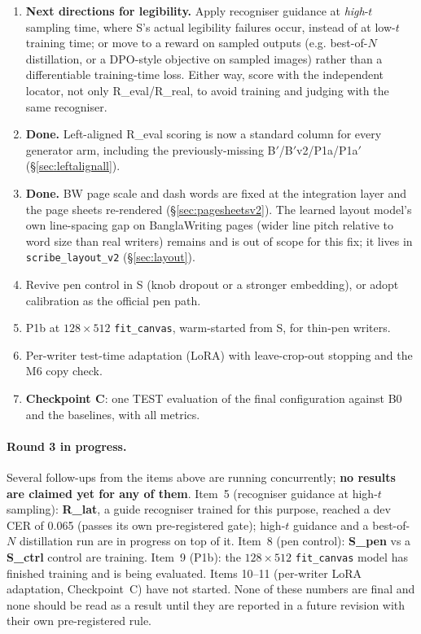 \documentclass[10.5pt,a4paper]{article}
\newcommand{\fp}[1]{\nolinkurl{#1}}
\newcommand{\Bp}{B$'$}
\begin{document}
\begin{enumerate}
  for recogniser pretraining when a generator is already available.
\item \textbf{Next directions for legibility.} Apply recogniser guidance at \emph{high}-$t$ sampling time, where S's actual
  legibility failures occur, instead of at low-$t$ training time; or move to a reward on sampled outputs (e.g. best-of-$N$
  distillation, or a DPO-style objective on sampled images) rather than a differentiable training-time loss. Either way,
  score with the independent locator, not only R\_eval/R\_real, to avoid training and judging with the same recogniser.
\item \textbf{Done.} Left-aligned R\_eval scoring is now a standard column for every generator arm, including the
  previously-missing \Bp/\Bp{}v2/P1a/P1a$'$ (\S\ref{sec:leftalignall}).
\item \textbf{Done.} BW page scale and dash words are fixed at the integration layer and the page sheets re-rendered
  (\S\ref{sec:pagesheetsv2}). The learned layout model's own line-spacing gap on BanglaWriting pages (wider line pitch
  relative to word size than real writers) remains and is out of scope for this fix; it lives in \fp{scribe_layout_v2}
  (\S\ref{sec:layout}).
\item Revive pen control in S (knob dropout or a stronger embedding), or adopt calibration as the official pen path.
\item P1b at $128\times512$ \texttt{fit\_canvas}, warm-started from S, for thin-pen writers.
\item Per-writer test-time adaptation (LoRA) with leave-crop-out stopping and the M6 copy check.
\item \textbf{Checkpoint C}: one TEST evaluation of the final configuration against B0 and the baselines, with all metrics.
\end{enumerate}

\paragraph{Round 3 in progress.} Several follow-ups from the items above are running concurrently; \textbf{no results are
claimed yet for any of them}. Item~5 (recogniser guidance at high-$t$ sampling): \textbf{R\_lat}, a guide recogniser
trained for this purpose, reached a dev CER of 0.065 (passes its own pre-registered gate); high-$t$ guidance and a
best-of-$N$ distillation run are in progress on top of it. Item~8 (pen control): \textbf{S\_pen} vs a \textbf{S\_ctrl}
control are training. Item~9 (P1b): the $128\times512$ \texttt{fit\_canvas} model has finished training and is being
evaluated. Items 10--11 (per-writer LoRA adaptation, Checkpoint~C) have not started. None of these numbers are final and
none should be read as a result until they are reported in a future revision with their own pre-registered rule.
\end{document}
